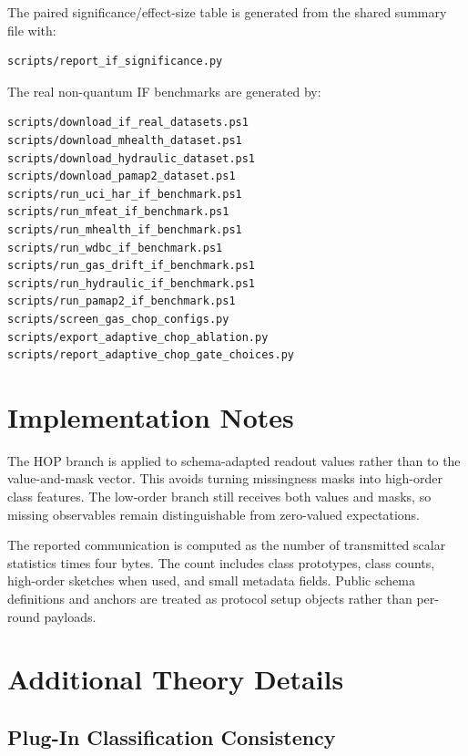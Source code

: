 The paired significance/effect-size table is generated from the shared summary file with:
\begin{verbatim}
scripts/report_if_significance.py
\end{verbatim}

The real non-quantum IF benchmarks are generated by:
\begin{verbatim}
scripts/download_if_real_datasets.ps1
scripts/download_mhealth_dataset.ps1
scripts/download_hydraulic_dataset.ps1
scripts/download_pamap2_dataset.ps1
scripts/run_uci_har_if_benchmark.ps1
scripts/run_mfeat_if_benchmark.ps1
scripts/run_mhealth_if_benchmark.ps1
scripts/run_wdbc_if_benchmark.ps1
scripts/run_gas_drift_if_benchmark.ps1
scripts/run_hydraulic_if_benchmark.ps1
scripts/run_pamap2_if_benchmark.ps1
scripts/screen_gas_chop_configs.py
scripts/export_adaptive_chop_ablation.py
scripts/report_adaptive_chop_gate_choices.py
\end{verbatim}

\section{Implementation Notes}

The HOP branch is applied to schema-adapted readout values rather than to the value-and-mask vector. This avoids turning missingness masks into high-order class features. The low-order branch still receives both values and masks, so missing observables remain distinguishable from zero-valued expectations.

The reported communication is computed as the number of transmitted scalar statistics times four bytes. The count includes class prototypes, class counts, high-order sketches when used, and small metadata fields. Public schema definitions and anchors are treated as protocol setup objects rather than per-round payloads.



\section{Additional Theory Details}

\subsection{Plug-In Classification Consistency}

